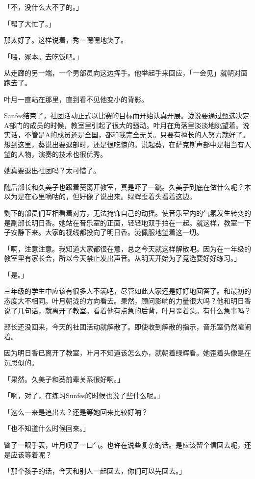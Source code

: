 \documentclass[UTF8]{ctexart}
\begin{document}
    「不，没什么大不了的。」

    「帮了大忙了。」

    那太好了。这样说着，秀一嘿嘿地笑了。

    「喂，冢本。去吃饭吧。」

    从走廊的另一端，一个男部员向这边挥手。他举起手来回应，「一会见」就朝对面跑去了。

    叶月一直站在那里，直到看不见他变小的背影。

    Sanfes结束了，社团活动正式以比赛的目标而开始认真开展。泷说要通过甄选决定A部门的成员的时候，教室里引起了很大的骚动。叶月在角落里淡淡地眺望着。说实话，不管是A的成员还是全国，都和我完全无关。只要有擅长的人努力就好了。想到这里，葵说出要退部时，还是很吃惊的。说起葵，在萨克斯声部中是相当有人望的人物，演奏的技术也很优秀。

    她真要退出社团吗？太可惜了。

    随后部长和久美子也跟着葵离开教室，真是吓了一跳。久美子到底在做什么呢？本以为是在心里嘀咕的，但好像了说出来。绿辉歪着头看着这边。

    剩下的部员们互相看着对方，无法掩饰自己的动摇。使音乐室内的气氛发生转变的是副部长明日香。她站在音乐室的正面，轻轻地双手拍在一起。就这样，教室一下子安静下来。大家的视线都投向了明日香。泷佩服地望着这一切。

    「啊，注意注意。我知道大家都很在意，总之今天就这样解散吧。因为在一年级的教室里有家长会，所以今天禁止发出声音。从明天开始为了竞选要好好练习。」

    「是。」

    三年级的学生中应该有很多人不满吧，尽管如此大家还是好好地回答了。和最初的态度大不相同。叶月朝泷的方向看去。果然，顾问影响的力量很大吗？他和明日香说了几句话，就离开了教室。看着他有点急的后背，叶月歪着头。有什么急事吗？

    部长还没回来，今天的社团活动就解散了。即使收到解散的指示，音乐室仍然喧闹着。

    因为明日香已离开了教室，叶月不知道该怎么办，就朝着绿辉看。她歪着头像是在沉思似的。

    「果然。久美子和葵前辈关系很好啊。」

    「啊，对了，在练习Sunfes的时候也说了些什么呢。」

    「这么一来是追出去？还是等她回来比较好呐？

    「也不知道什么时候回来。」

    瞥了一眼手表，叶月叹了一口气。也许在说些复杂的话。是应该留个信回去呢，还是应该等着呢？

    「那个孩子的话，今天和别人一起回去，你们可以先回去。」
\end{document}
